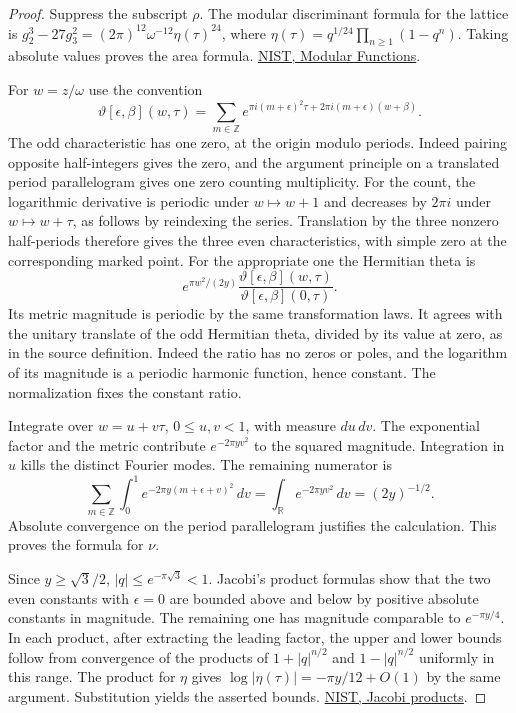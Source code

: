 \documentclass[a4paper,11pt]{article}
\theoremstyle{definition}
\theoremstyle{remark}
\newcommand{\RR}{\mathbb R}\newcommand{\CC}{\mathbb C}\newcommand{\QQ}{\mathbb Q}
\newcommand{\ZZ}{\mathbb Z}\newcommand{\ord}{\operatorname{ord}}
\numberwithin{equation}{section}
\begin{document}
\begin{proof}
Suppress the subscript \(\rho\). The modular discriminant formula
for the lattice is \(g_2^3-27g_3^2=(2\pi)^{12}\omega^{-12}
\eta(\tau)^{24}\), where
\(\eta(\tau)=q^{1/24}\prod_{n\ge1}(1-q^n)\).
Taking absolute values proves the area formula.
\href{https://dlmf.nist.gov/23.15}{NIST, Modular Functions}.

For \(w=z/\omega\) use the convention
\[
 \vartheta[\epsilon,\beta](w,\tau)
   =\sum_{m\in\ZZ} e^{\pi i(m+\epsilon)^2\tau+
                                      2\pi i(m+\epsilon)(w+\beta)} .
\]
The odd characteristic has one zero, at the origin modulo periods.
Indeed pairing opposite half-integers gives the zero, and the
argument principle on a translated period parallelogram gives one
zero counting multiplicity. For the count, the logarithmic
derivative is periodic under \(w\mapsto w+1\) and decreases by
\(2\pi i\) under \(w\mapsto w+\tau\), as follows by reindexing the
series. Translation by the three nonzero half-periods therefore
gives the three even characteristics, with simple zero at the
corresponding marked point. For the appropriate one the Hermitian
theta is
\[
      e^{\pi w^2/(2y)}
        \frac{\vartheta[\epsilon,\beta](w,\tau)}
             {\vartheta[\epsilon,\beta](0,\tau)} .
\]
Its metric magnitude is periodic by the same transformation laws.
It agrees with the unitary translate of the odd Hermitian theta,
divided by its value at zero, as in the source definition. Indeed the
ratio has no zeros or poles, and the logarithm of its magnitude is
a periodic harmonic function, hence constant. The normalization
fixes the constant ratio.

Integrate over \(w=u+v\tau\), \(0\le u,v<1\), with measure
\(du\,dv\). The exponential factor and the metric contribute
\(e^{-2\pi yv^2}\) to the squared magnitude. Integration in \(u\)
kills the distinct Fourier modes. The remaining numerator is
\[
  \sum_{m\in\ZZ}\int_0^1 e^{-2\pi y(m+\epsilon+v)^2}\,dv
                 =\int_\RR e^{-2\pi yv^2}\,dv=(2y)^{-1/2}.
\]
Absolute convergence on the period parallelogram justifies the
calculation. This proves the formula for \(\nu\).

Since \(y\ge\sqrt3/2\), \(|q|\le e^{-\pi\sqrt3}<1\).
Jacobi's product formulas show that the two even constants with
\(\epsilon=0\) are bounded above and below by positive absolute
constants in magnitude. The remaining one has magnitude comparable
to \(e^{-\pi y/4}\). In each product, after extracting the leading
factor, the upper and lower bounds follow from convergence of the
products of \(1+|q|^{n/2}\) and \(1-|q|^{n/2}\) uniformly in this
range. The product for \(\eta\) gives
\(\log|\eta(\tau)|=-\pi y/12+O(1)\) by the same argument.
Substitution yields the asserted bounds.
\href{https://dlmf.nist.gov/20.5}{NIST, Jacobi products}.
\end{proof}
\end{document}
